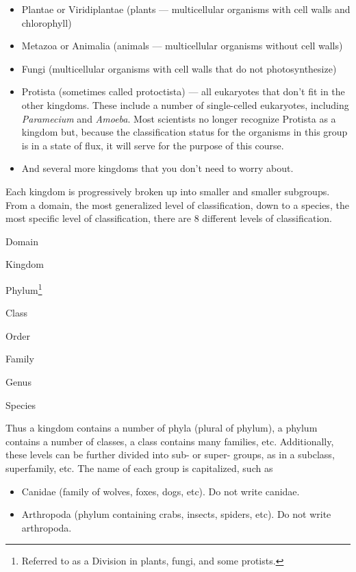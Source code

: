 \documentclass[11pt, addpoints]{exam}
\begin{document}
\begin{itemize}
\item
  Plantae or Viridiplantae (plants — multicellular organisms with
  cell walls and chlorophyll)
\item
  Metazoa or Animalia (animals — multicellular organisms without cell
  walls)
\item
  Fungi (multicellular organisms with cell walls that do not
  photosynthesize)
\item
  Protista (sometimes called protoctista) — all eukaryotes that don't
  fit in the other kingdoms. These include a number of single-celled
  eukaryotes, including \emph{Paramecium} and \emph{Amoeba}. Most
  scientists no longer recognize Protista as a kingdom but, because the
  classification status for the organisms in this group is in a state of
  flux, it will serve for the purpose of this course.
\item
  And several more kingdoms that you don't need to worry about.
\end{itemize}

Each kingdom is progressively broken up into smaller and smaller
subgroups. From a domain, the most generalized level of classification,
down to a species, the most specific level of classification, there are
8 different levels of classification.

\begin{multicols}{2}
\noindent Domain

\noindent Kingdom

\noindent Phylum\footnote{Referred to as a Division in plants, fungi, and some protists.}

\noindent Class

\noindent Order

\noindent Family

\noindent Genus

\noindent Species
\end{multicols}

Thus a kingdom contains a number of phyla (plural of phylum), a phylum
contains a number of classes, a class contains many families, etc.
Additionally, these levels can be further divided into sub- or super-
groups, as in a subclass, superfamily, etc. The name of each group is
capitalized, such as

\begin{itemize}
	\item Canidae (family of wolves, foxes, dogs, etc). Do not write canidae.

	\item Arthropoda (phylum containing crabs, insects, spiders, etc). Do not
write arthropoda.
\end{itemize}
\end{document}
